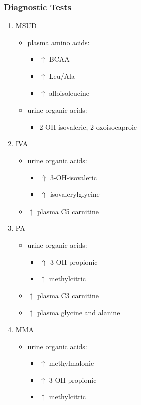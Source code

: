 \documentclass{scrartcl}
\begin{document}
\subsubsection{Diagnostic Tests}
\label{sec:org110195b}
\begin{enumerate}
\item MSUD
\label{sec:orgd506651}
\begin{itemize}
\item plasma amino acids:
\begin{itemize}
\item \(\uparrow\) BCAA
\item \(\uparrow\) Leu/Ala
\item \(\uparrow\) alloisoleucine
\end{itemize}
\item urine organic acids:
\begin{itemize}
\item 2-OH-isovaleric, 2-oxoisocaproic
\end{itemize}
\end{itemize}

\item IVA
\label{sec:org8761943}
\begin{itemize}
\item urine organic acids:
\begin{itemize}
\item \(\Uparrow\) 3-OH-isovaleric
\item \(\Uparrow\) isovalerylglycine
\end{itemize}
\item \(\uparrow\) plasma C5 carnitine
\end{itemize}

\item PA
\label{sec:org2cc71fd}
\begin{itemize}
\item urine organic acids:
\begin{itemize}
\item \(\Uparrow\) 3-OH-propionic
\item \(\uparrow\) methylcitric
\end{itemize}

\item \(\uparrow\) plasma C3 carnitine
\item \(\uparrow\) plasma glycine and alanine
\end{itemize}

\item MMA
\label{sec:orgeb180cb}
\begin{itemize}
\item urine organic acids:
\begin{itemize}
\item \(\uparrow\) methylmalonic
\item \(\uparrow\) 3-OH-propionic
\item \(\uparrow\) methylcitric
\end{itemize}


\end{itemize}
\end{enumerate}
\end{document}
